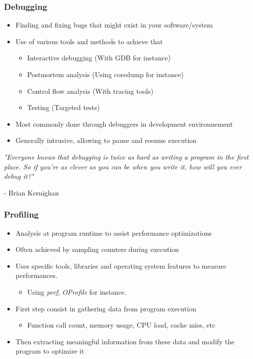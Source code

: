 \begin{frame}
  \frametitle{Debugging}
  \begin{itemize}
    \item Finding and fixing bugs that might exist in your software/system
    \item Use of various tools and methods to achieve that
    \begin{itemize}
      \item Interactive debugging (With GDB for instance)
      \item Postmortem analysis (Using coredump for instance)
      \item Control flow analysis (With tracing tools)
      \item Testing (Targeted tests)
    \end{itemize}
    \item Most commonly done through debuggers in development environnement
    \item Generally intrusive, allowing to pause and resume execution
  \end{itemize}
  \vspace{0.5cm}

  {\small \em "Everyone knows that debugging is twice as hard as writing a program in the first place. So if you're as
    clever as you can be when you write it, how will you ever debug it?" 

  - Brian Kernighan }

\end{frame}

\begin{frame}
  \frametitle{Profiling}
  \begin{itemize}
    \item Analysis at program runtime to assist performance optimizations
    \item Often achieved by sampling counters during execution
    \item Uses specific tools, libraries and operating system features to
          measure performances.
    \begin{itemize}
      \item Using {\em perf}, {\em OProfile} for instance.
    \end{itemize}
    \item First step consist in gathering data from program execution
    \begin{itemize}
      \item Function call count, memory usage, CPU load, cache miss, etc
    \end{itemize}
    \item Then extracting meaningful information from these data and modify the
          program to optimize it
\end{itemize}
\end{frame}

